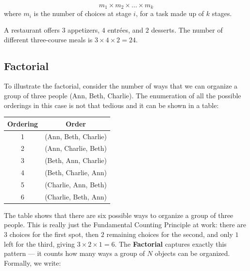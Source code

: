 \documentclass[
  11pt,
  letterpaper,
  DIV=11,
  numbers=noendperiod,
  oneside,
  open=any]{scrreprt}
\begin{document}
\begin{bsformula}

\[m_1 \times m_2 \times \dots \times m_k\] where \(m_i\) is the number
of choices at stage \(i\), for a task made up of \(k\) stages.

\end{bsformula}

\begin{bsexample}[Example]

A restaurant offers \(3\) appetizers, \(4\) entrées, and \(2\) desserts.
The number of different three-course meals is
\(3 \times 4 \times 2 = 24\).

\end{bsexample}

\subsection*{Factorial}\label{factorial}

To illustrate the factorial, consider the number of ways that we can
organize a group of three people (Ann, Beth, Charlie). The enumeration
of all the possible orderings in this case is not that tedious and it
can be shown in a table:

\begin{center}
\begin{tabular}{cc}
\toprule
Ordering & Order \\
\midrule
1 & (Ann, Beth, Charlie) \\
2 & (Ann, Charlie, Beth) \\
3 & (Beth, Ann, Charlie) \\
4 & (Beth, Charlie, Ann) \\
5 & (Charlie, Ann, Beth) \\
6 & (Charlie, Beth, Ann) \\
\bottomrule
\end{tabular}
\end{center}

The table shows that there are six possible ways to organize a group of
three people. This is really just the Fundamental Counting Principle at
work: there are \(3\) choices for the first spot, then \(2\) remaining
choices for the second, and only \(1\) left for the third, giving
\(3 \times 2 \times 1 = 6\). The \textbf{Factorial} captures exactly
this pattern --- it counts how many ways a group of \(N\) objects can be
organized. Formally, we write:
\end{document}
